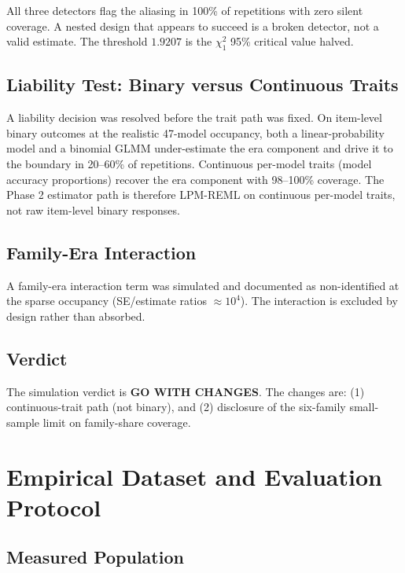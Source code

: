 \documentclass[journal]{IEEEtran}
\begin{document}
All three detectors flag the aliasing in 100\% of repetitions with zero silent coverage. A nested design that appears to succeed is a broken detector, not a valid estimate. The threshold $1.9207$ is the $\chi^2_1$ 95\% critical value halved.

\subsection{Liability Test: Binary versus Continuous Traits}

A liability decision was resolved before the trait path was fixed. On item-level binary outcomes at the realistic 47-model occupancy, both a linear-probability model and a binomial GLMM under-estimate the era component and drive it to the boundary in 20--60\% of repetitions. Continuous per-model traits (model accuracy proportions) recover the era component with 98--100\% coverage. The Phase 2 estimator path is therefore LPM-REML on continuous per-model traits, not raw item-level binary responses.

\subsection{Family-Era Interaction}

A family-era interaction term was simulated and documented as non-identified at the sparse occupancy (SE/estimate ratios $\approx 10^4$). The interaction is excluded by design rather than absorbed.

\subsection{Verdict}

The simulation verdict is \textbf{GO WITH CHANGES}. The changes are: (1) continuous-trait path (not binary), and (2) disclosure of the six-family small-sample limit on family-share coverage.

\section{Empirical Dataset and Evaluation Protocol}
\label{sec:empirical_protocol}

\subsection{Measured Population}
\end{document}
